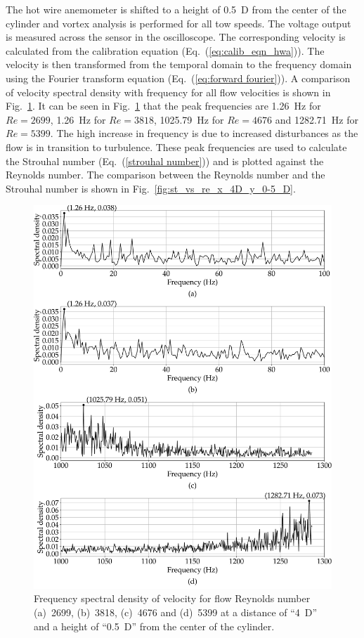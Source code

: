 The hot wire anemometer is shifted to a height of 0.5~D from the center of the cylinder and vortex analysis is performed for all tow speeds. The voltage output is measured across the sensor in the oscilloscope. The corresponding velocity is calculated from the calibration equation (Eq.~(\ref{eq:calib_eqn_hwa})). The velocity is then transformed from the temporal domain to the frequency domain using the Fourier transform equation (Eq.~(\ref{eq:forward fourier})). A comparison of velocity spectral density with frequency for all flow velocities is shown in Fig.~\ref{fig:surface_x_4D_y_0-5_D}. It can be seen in Fig.~\ref{fig:surface_x_4D_y_0-5_D} that the peak frequencies are 1.26~Hz for $Re = 2699$, 1.26~Hz for $Re = 3818$, 1025.79~Hz for $Re = 4676$ and 1282.71~Hz for $Re = 5399$. The high increase in frequency is due to increased disturbances as the flow is in transition to turbulence. These peak frequencies are used to calculate the Strouhal number (Eq.~(\ref{strouhal number})) and is plotted against the Reynolds number. The comparison between the Reynolds number and the Strouhal number is shown in Fig.~\ref{fig:st_vs_re_x_4D_y_0-5_D}. 
\begin{figure}[H]
    \centering
    \includegraphics[width=\linewidth]{gfx/FFT_all_freq_x_4D_y_0-5_D.pdf}
    \caption{Frequency spectral density of velocity for flow Reynolds number (a)~2699, (b)~3818, (c)~4676 and (d)~5399 at a distance of \enquote{4~D} and a height of \enquote{0.5~D} from the center of the cylinder.}
    \label{fig:surface_x_4D_y_0-5_D}
\end{figure}
